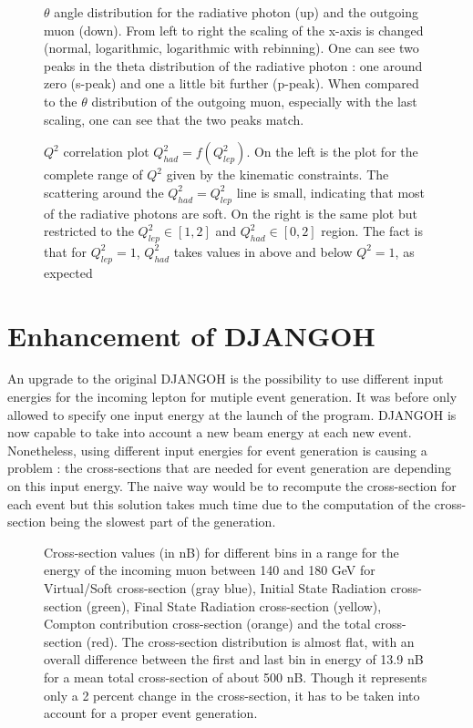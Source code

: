 \begin{figure}[htb]
\centerline{}
\caption{$\theta$ angle distribution for the radiative photon (up) and the outgoing muon (down). From left
to right the scaling of the x-axis is changed (normal, logarithmic, logarithmic with rebinning).
One can see two peaks in the theta distribution of the radiative photon : one around zero (s-peak) and
one a little bit further (p-peak). When compared to the $\theta$ distribution of the outgoing muon, especially with the
last scaling, one can see that the two peaks match.}\label{fig:anglesp}
\end{figure}
\hfill
\begin{figure}[htb]
\centerline{}
\caption{$Q^2$ correlation plot $Q^2_{had}=f(Q^2_{lep})$. On the left is the plot for the complete range of $Q^2$
given by the kinematic constraints. The scattering around the $Q^2_{had} = Q^2_{lep}$ line is small, indicating that
most of the radiative photons are soft. On the right is the same plot but restricted to the $Q^2_{lep}\in[1,2]$ and
$Q^2_{had}\in[0,2]$ region. The fact is that for $Q^2_{lep}=1$, $Q^2_{had}$ takes values in above and below $Q^2=1$, as expected}\label{fig:Q2corr}
\end{figure}


\section{Enhancement of DJANGOH}

An upgrade to the original DJANGOH is the possibility to use different input energies for
the incoming lepton for mutiple event generation. It was before only allowed to
specify one input energy at the launch of the program. DJANGOH is now capable to take
into account a new beam energy at each new event.
Nonetheless, using different input energies for event generation is causing a problem :
the cross-sections that are needed for event generation are depending on this input energy.
The naive way would be to recompute the cross-section for each event but this solution
takes much time due to the computation of the cross-section being the slowest part of
the generation.

\begin{figure}[htb]
\centerline{}
\caption{Cross-section values (in nB) for different bins in a range for the energy of the incoming muon between 140 and 180 GeV for Virtual/Soft cross-section
(gray blue), Initial State Radiation cross-section (green), Final State Radiation cross-section (yellow), Compton contribution
cross-section (orange) and the total cross-section (red). The cross-section distribution is almost flat, with an overall difference
between the first and last bin in energy of 13.9 nB for a mean total cross-section of about 500 nB. Though it represents only a 2 percent
change in the cross-section, it has to be taken into account for a proper event generation.}\label{fig:gridxs}
\end{figure}


